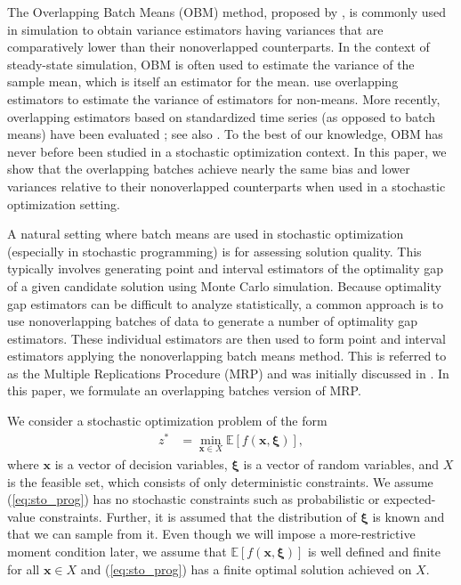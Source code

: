\documentclass[12pt]{article}
\newcommand{\e}[1]{\mathbb{E} \left[ #1 \right]
}
\newcommand{\x}{\mathbf{x}}
\newcommand{\xit}{\boldsymbol{\xi}}
\begin{document}
The Overlapping Batch Means (OBM) method, proposed by \citet{Meketon1984}, is commonly used in simulation to obtain variance estimators having variances that are comparatively lower than their nonoverlapped counterparts. 
In the context of steady-state simulation, OBM is often used to estimate the variance of the sample mean, which is itself an estimator for the mean. 
\cite{SAH90} use overlapping estimators to estimate the variance of estimators for non-means. 
More recently, overlapping estimators based on standardized time series (as opposed to batch means) have been evaluated \citep{Alexopoulos01012007,Alexopoulos2007}; see also \cite{Meterelliyoz_etal_12}.
To the best of our knowledge, OBM has never before been studied in a stochastic optimization context. 
In this paper, we show that the overlapping batches achieve nearly the same bias and lower variances relative to their nonoverlapped counterparts when used in a stochastic optimization setting.
  
A natural setting where batch means are used in stochastic optimization (especially in stochastic programming) is for assessing solution quality. 
This typically involves generating point and interval estimators of the optimality gap of a given candidate solution using Monte Carlo simulation. 
Because optimality gap estimators can be difficult to analyze statistically, a common approach is to use nonoverlapping batches of data to generate a number of optimality gap estimators. 
These individual estimators are then used to form point and interval estimators applying the nonoverlapping batch means method.
This is referred to as the Multiple Replications Procedure (MRP) and was initially discussed in \citep{Mak1999}.   
In this paper, we formulate an overlapping batches version of MRP.


We consider a stochastic optimization problem of the form 
\begin{align} \tag{SP} \label{eq:sto_prog} 
	z^* & = \min_{\x \in X} \e{f(\x,\xit)},
\end{align}
where $\x$ is a vector of decision variables, $\xit$ is a vector of random variables, and $X$ is the feasible set, which consists of only deterministic constraints. 
We assume (\ref{eq:sto_prog}) has no stochastic constraints such as probabilistic or expected-value constraints. 
Further, it is assumed that the distribution of $\xit$ is known and that we can sample from it.
Even though we will impose a more-restrictive moment condition later, we assume that $\e{f(\x,\xit)}$ is well defined and finite for all $\x \in X$ and (\ref{eq:sto_prog}) has a finite optimal solution achieved on $X$.
\end{document}
